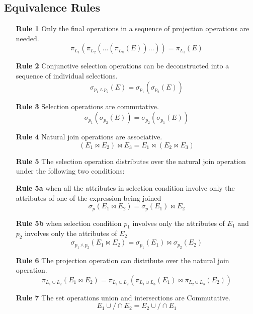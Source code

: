 \documentclass[11pt,a4paper]{article}
\begin{document}
\subsection{Equivalence Rules}
\begin{enumerate}
    \item [\textbf{Rule 1 }] Only the final operations in a sequence of projection operations are needed.
        \[
        \pi_{L_1}(\pi_{L_2}(\dots(\pi_{L_n}(E))\dots)) = \pi_{L_1}(E)
        \]
    
    \item [\textbf{Rule 2 }] Conjunctive selection operations can be deconstructed into a sequence of individual selections.
        \[
        \sigma_{p_1 \land p_2}(E) = \sigma_{p_1}(\sigma_{p_2}(E))
        \]

    \item [\textbf{Rule 3 }] Selection operations are commutative.
        \[
        \sigma_{p_1}(\sigma_{p_2}(E)) = \sigma_{p_2}(\sigma_{p_1}(E))
        \]

    \item [\textbf{Rule 4 }] Natural join operations are associative.
        \[
        (E_1 \bowtie E_2) \bowtie E_3 = E_1 \bowtie (E_2 \bowtie E_3)
        \]

    \item [\textbf{Rule 5 }] The selection operation distributes over the natural join operation under the following two conditions:
    
    \item [\textbf{Rule 5a }] when all the attributes in selection condition involve only the attributes of one of the expression being joined
        \[
        \sigma_p(E_1 \bowtie E_2) = \sigma_p(E_1) \bowtie E_2
        \]

    \item [\textbf{Rule 5b }] when selection condition $p_1$ involves only the attributes of $E_1$ and $p_2$ involves only the attributes of $E_2$
        \[
        \sigma_{p_1 \land p_2}(E_1 \bowtie E_2) = \sigma_{p_1}(E_1) \bowtie \sigma_{p_2}(E_2)
        \]

    \item [\textbf{Rule 6 }] The projection operation can distribute over the natural join operation.
        \[
        \pi_{L_1 \cup L_2}(E_1 \bowtie E_2) = \pi_{L_1 \cup L_2}(\pi_{L_1 \cup L_3}(E_1) \bowtie \pi_{L_2 \cup L_3}(E_2))
        \]

    \item [\textbf{Rule 7 }] The set operations union and intersections are Commutative.
        \[
        E_1 \cup / \cap E_2 = E_2 \cup / \cap E_1 
        \]
    

\end{enumerate}
\end{document}
